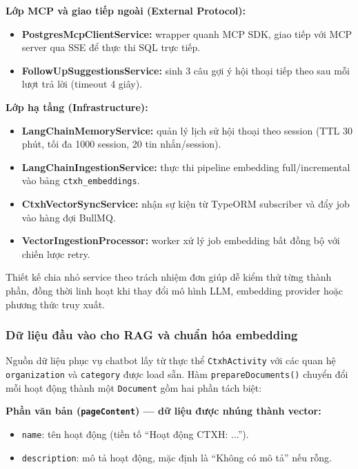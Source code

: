 \textbf{Lớp MCP và giao tiếp ngoài (External Protocol):}
\begin{itemize}
	\item \textbf{PostgresMcpClientService:} wrapper quanh MCP SDK, giao tiếp với MCP server qua SSE để thực thi SQL trực tiếp.
	\item \textbf{FollowUpSuggestionsService:} sinh 3 câu gợi ý hội thoại tiếp theo sau mỗi lượt trả lời (timeout 4 giây).
\end{itemize}

\textbf{Lớp hạ tầng (Infrastructure):}
\begin{itemize}
	\item \textbf{LangChainMemoryService:} quản lý lịch sử hội thoại theo session (TTL 30 phút, tối đa 1000 session, 20 tin nhắn/session).
	\item \textbf{LangChainIngestionService:} thực thi pipeline embedding full/incremental vào bảng \texttt{ctxh\_embeddings}.
	\item \textbf{CtxhVectorSyncService:} nhận sự kiện từ TypeORM subscriber và đẩy job vào hàng đợi BullMQ.
	\item \textbf{VectorIngestionProcessor:} worker xử lý job embedding bất đồng bộ với chiến lược retry.
\end{itemize}

Thiết kế chia nhỏ service theo trách nhiệm đơn giúp dễ kiểm thử từng thành phần, đồng thời linh hoạt khi thay đổi mô hình LLM, embedding provider hoặc phương thức truy xuất.

\subsubsection{Dữ liệu đầu vào cho RAG và chuẩn hóa embedding}
Nguồn dữ liệu phục vụ chatbot lấy từ thực thể \texttt{CtxhActivity} với các quan hệ \texttt{organization} và \texttt{category} được load sẵn. Hàm \texttt{prepareDocuments()} chuyển đổi mỗi hoạt động thành một \texttt{Document} gồm hai phần tách biệt:

\textbf{Phần văn bản (\texttt{pageContent}) — dữ liệu được nhúng thành vector:}
\begin{itemize}
	\item \texttt{name}: tên hoạt động (tiền tố ``Hoạt động CTXH: ...'').
	\item \texttt{description}: mô tả hoạt động, mặc định là ``Không có mô tả'' nếu rỗng.
\end{itemize}

